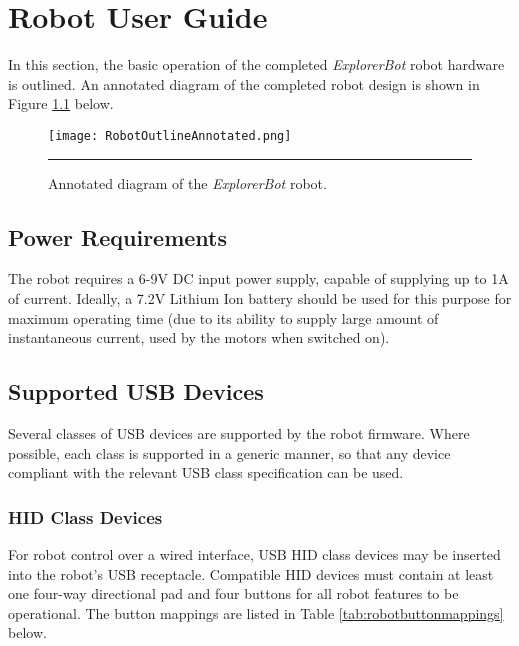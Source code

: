 \chapter{Robot User Guide}
\label{app:robotuserguide}

In this section, the basic operation of the completed \textit{ExplorerBot} robot hardware is outlined. An annotated diagram of the completed robot design is shown in Figure \ref{fig:robotoutlineannotated} below.

\begin{figure}[H]
	\centering
		\texttt{[image: RobotOutlineAnnotated.png]}
	\rule{35em}{0.5pt}
	\caption[Annotated diagram of the robot]{Annotated diagram of the \textit{ExplorerBot} robot.}
	\label{fig:robotoutlineannotated}
\end{figure}

\section{Power Requirements}

The robot requires a 6-9V DC input power supply, capable of supplying up to 1A of current. Ideally, a 7.2V Lithium Ion battery should be used for this purpose for maximum operating time (due to its ability to supply large amount of instantaneous current, used by the motors when switched on).

\section{Supported USB Devices}

Several classes of USB devices are supported by the robot firmware. Where possible, each class is supported in a generic manner, so that any device compliant with the relevant USB class specification can be used.

\subsection{HID Class Devices}

For robot control over a wired interface, USB HID class devices may be inserted into the robot's USB receptacle. Compatible HID devices must contain at least one four-way directional pad and four buttons for all robot features to be operational. The button mappings are listed in Table \ref{tab:robotbuttonmappings} below.

